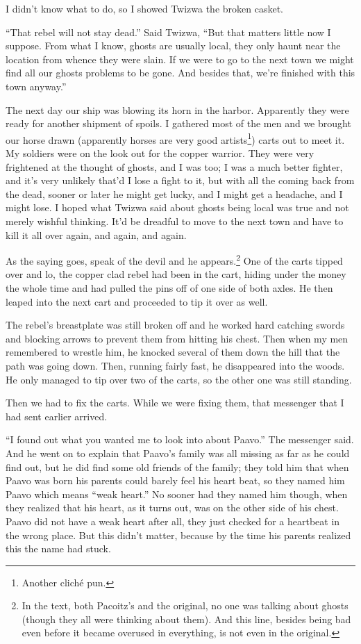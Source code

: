 I didn't know what to do, so I showed Twi\-zwa the broken casket.

``That rebel will not stay dead.'' Said Twi\-zwa, ``But that matters little now I suppose. From what I know, ghosts are usually local, they only haunt near the location from whence they were slain. If we were to go to the next town we might find all our ghosts problems to be gone. And besides that, we're finished with this town anyway.''

\tbreak

The next day our ship was blowing its horn in the harbor. Apparently they were ready for another shipment of spoils. I gathered most of the men and we brought our horse drawn (apparently horses are very good artists\footnote{Another clich\'{e} pun.}) carts out to meet it. My soldiers were on the look out for the copper warrior. They were very frightened at the thought of ghosts, and I was too; I was a much better fighter, and it's very unlikely that'd I lose a fight to it, but with all the coming back from the dead, sooner or later he might get lucky, and I might get a headache, and I might lose. I hoped what Twi\-zwa said about ghosts being local was true and not merely wishful thinking. It'd be dreadful to move to the next town and have to kill it all over again, and again, and again.

As the saying goes, speak of the devil and he appears.\footnote{In the text, both Pa\-co\-itz's and the original, no one was talking about ghosts (though they all were thinking about them). And this line, besides being bad even before it became overused in everything, is not even in the original.} One of the carts tipped over and lo, the copper clad rebel had been in the cart, hiding under the money the whole time and had pulled the pins off of one side of both axles. He then leaped into the next cart and proceeded to tip it over as well.

The rebel's breastplate was still broken off and he worked hard catching swords and blocking arrows to prevent them from hitting his chest. Then when my men remembered to wrestle him, he knocked several of them down the hill that the path was going down. Then, running fairly fast, he disappeared into the woods. He only managed to tip over two of the carts, so the other one was still standing.

Then we had to fix the carts. While we were fixing them, that messenger that I had sent earlier arrived.

``I found out what you wanted me to look into about Paa\-vo.'' The messenger said. And he went on to explain that Paa\-vo's family was all missing as far as he could find out, but he did find some old friends of the family; they told him that when Paa\-vo was born his parents could barely feel his heart beat, so they named him Paa\-vo which means ``weak heart.'' No sooner had they named him though, when they realized that his heart, as it turns out, was on the other side of his chest. Paa\-vo did not have a weak heart after all, they just checked for a heartbeat in the wrong place. But this didn't matter, because by the time his parents realized this the name had stuck.

